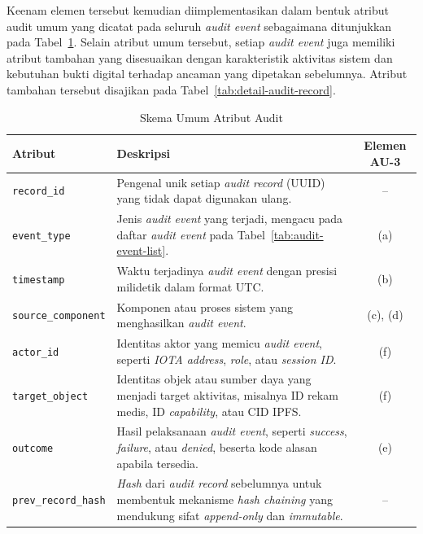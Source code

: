 Keenam elemen tersebut kemudian diimplementasikan dalam bentuk atribut audit umum yang dicatat pada seluruh \textit{audit event} sebagaimana ditunjukkan pada Tabel~\ref{tab:skema-umum-audit-record}. Selain atribut umum tersebut, setiap \textit{audit event} juga memiliki atribut tambahan yang disesuaikan dengan karakteristik aktivitas sistem dan kebutuhan bukti digital terhadap ancaman yang dipetakan sebelumnya. Atribut tambahan tersebut disajikan pada Tabel~\ref{tab:detail-audit-record}.

\begin{table}[h]
\centering
\caption{Skema Umum Atribut Audit}
\label{tab:skema-umum-audit-record}
\begin{tabular}{|>{\raggedright\arraybackslash}p{3.8cm}|>{\raggedright\arraybackslash}p{7.2cm}|c|}
\hline
\textbf{Atribut} & \textbf{Deskripsi} & \textbf{Elemen AU-3} \\
\hline
\texttt{record\_id} &
Pengenal unik setiap \textit{audit record} (UUID) yang tidak dapat digunakan ulang. &
-- \\
\hline

\texttt{event\_type} &
Jenis \textit{audit event} yang terjadi, mengacu pada daftar \textit{audit event} pada Tabel~\ref{tab:audit-event-list}. &
(a) \\
\hline

\texttt{timestamp} &
Waktu terjadinya \textit{audit event} dengan presisi milidetik dalam format UTC. &
(b) \\
\hline

\texttt{source\_component} &
Komponen atau proses sistem yang menghasilkan \textit{audit event}. &
(c), (d) \\
\hline

\texttt{actor\_id} &
Identitas aktor yang memicu \textit{audit event}, seperti \textit{IOTA address}, \textit{role}, atau \textit{session ID}. &
(f) \\
\hline

\texttt{target\_object} &
Identitas objek atau sumber daya yang menjadi target aktivitas, misalnya ID rekam medis, ID \textit{capability}, atau CID IPFS. &
(f) \\
\hline

\texttt{outcome} &
Hasil pelaksanaan \textit{audit event}, seperti \textit{success}, \textit{failure}, atau \textit{denied}, beserta kode alasan apabila tersedia. &
(e) \\
\hline

\texttt{prev\_record\_hash} &
\textit{Hash} dari \textit{audit record} sebelumnya untuk membentuk mekanisme \textit{hash chaining} yang mendukung sifat \textit{append-only} dan \textit{immutable}. &
-- \\
\hline

\end{tabular}
\end{table}


